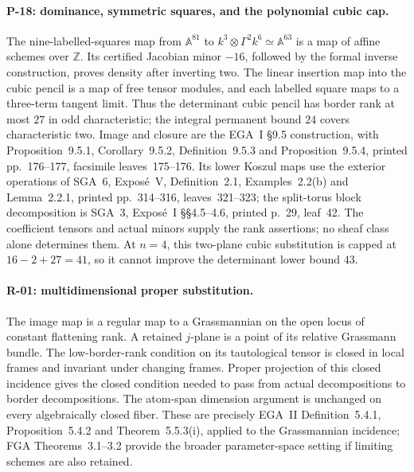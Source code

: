\paragraph{P-18: dominance, symmetric squares, and the polynomial cubic cap.}
The nine-labelled-squares map from $\mathbb A^{81}$ to
$k^3\otimes\Gamma^2k^6\simeq\mathbb A^{63}$ is a map of
affine schemes over $\mathbb Z$. Its certified Jacobian
minor $-16$, followed by the formal inverse construction,
proves density after inverting two. The linear insertion
map into the cubic pencil is a map of free tensor modules,
and each labelled square maps to a three-term tangent
limit. Thus the determinant cubic pencil has border rank
at most $27$ in odd characteristic; the integral permanent
bound $24$ covers characteristic two. Image and closure
are the EGA~I \S9.5 construction, with Proposition~9.5.1,
Corollary~9.5.2, Definition~9.5.3 and Proposition~9.5.4,
printed pp.~176--177, facsimile leaves~175--176. Its
lower Koszul maps use the exterior operations of SGA~6,
Expos\'e~V, Definition~2.1, Examples~2.2(b) and
Lemma~2.2.1, printed pp.~314--316, leaves~321--323;
the split-torus block decomposition is SGA~3,
Expos\'e~I \S\S4.5--4.6, printed p.~29, leaf~42.
The coefficient tensors and actual minors supply the
rank assertions; no sheaf class alone determines them.
At $n=4$, this two-plane cubic substitution is capped
at $16-2+27=41$, so it cannot improve the determinant
lower bound $43$.

\paragraph{R-01: multidimensional proper substitution.}
The image map is a regular map to a Grassmannian on
the open locus of constant flattening rank. A retained
$j$-plane is a point of its relative Grassmann bundle.
The low-border-rank condition on its tautological
tensor is closed in local frames and invariant under
changing frames. Proper projection of this closed
incidence gives the closed condition needed to pass
from actual decompositions to border decompositions.
The atom-span dimension argument is unchanged on
every algebraically closed fiber. These are precisely
EGA~II Definition~5.4.1, Proposition~5.4.2 and
Theorem~5.5.3(i), applied to the Grassmannian incidence;
FGA Theorems~3.1--3.2 provide the broader parameter-space
setting if limiting schemes are also retained.

